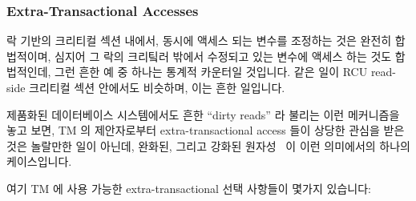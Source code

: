 \subsubsection{Extra-Transactional Accesses}
\label{sec:future:Extra-Transactional Accesses}

락 기반의 크리티컬 섹션 내에서, 동시에 액세스 되는 변수를 조정하는 것은 완전히
합법적이며, 심지어 그 락의 크리팈러 밖에서 수정되고 있는 변수에 액세스 하는
것도 합법적인데, 그런 흔한 예 중 하나는 통계적 카운터일 것입니다.
같은 일이 RCU read-side 크리티컬 섹션 안에서도 비슷하며, 이는 흔한 일입니다.

제품화된 데이터베이스 시스템에서도 흔한 ``dirty reads'' 라 불리는 이런
메커니즘을 놓고 보면, TM 의 제안자로부터 extra-transactional access 들이 상당한
관심을 받은 것은 놀랄만한 일이 아닌데, 완화된, 그리고 강화된
원자성~\cite{Blundell2006TMdeadlock} 이 이런 의미에서의 하나의 케이스입니다.

여기 TM 에 사용 가능한 extra-transactional 선택 사항들이 몇가지 있습니다:

